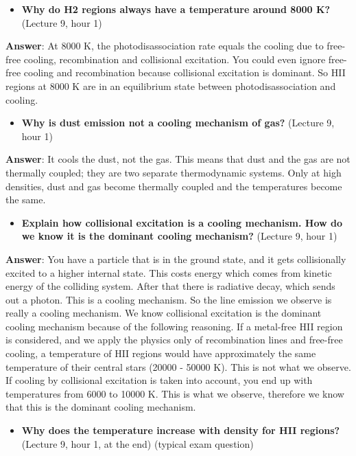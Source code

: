 \documentclass[11pt]{article}
\providecommand{\tightlist}{%
      \setlength{\itemsep}{0pt}\setlength{\parskip}{0pt}}
\begin{document}
    \begin{itemize}
\tightlist
\item
  \textbf{Why do H2 regions always have a temperature around 8000 K?}
  (Lecture 9, hour 1)
\end{itemize}

\textbf{Answer}: At 8000 K, the photodisassociation rate equals the
cooling due to free-free cooling, recombination and collisional
excitation. You could even ignore free-free cooling and recombination
because collisional excitation is dominant. So HII regions at 8000 K are
in an equilibrium state between photodisassociation and cooling.

    \begin{itemize}
\tightlist
\item
  \textbf{Why is dust emission not a cooling mechanism of gas?} (Lecture
  9, hour 1)
\end{itemize}

\textbf{Answer}: It cools the dust, not the gas. This means that dust
and the gas are not thermally coupled; they are two separate
thermodynamic systems. Only at high densities, dust and gas become
thermally coupled and the temperatures become the same.

    \begin{itemize}
\tightlist
\item
  \textbf{Explain how collisional excitation is a cooling mechanism. How
  do we know it is the dominant cooling mechanism?} (Lecture 9, hour 1)
\end{itemize}

\textbf{Answer}: You have a particle that is in the ground state, and it
gets collisionally excited to a higher internal state. This costs energy
which comes from kinetic energy of the colliding system. After that
there is radiative decay, which sends out a photon. This is a cooling
mechanism. So the line emission we observe is really a cooling
mechanism. We know collisional excitation is the dominant cooling
mechanism because of the following reasoning. If a metal-free HII region
is considered, and we apply the physics only of recombination lines and
free-free cooling, a temperature of HII regions would have approximately
the same temperature of their central stars (20000 - 50000 K). This is
not what we observe. If cooling by collisional excitation is taken into
account, you end up with temperatures from 6000 to 10000 K. This is what
we observe, therefore we know that this is the dominant cooling
mechanism.

    \begin{itemize}
\tightlist
\item
  \textbf{Why does the temperature increase with density for HII
  regions?} (Lecture 9, hour 1, at the end) (typical exam question)
\end{itemize}
\end{document}
